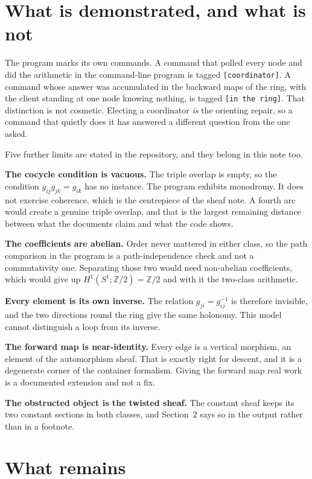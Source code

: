 \documentclass[11pt,a4paper]{article}
\begin{document}
\section{What is demonstrated, and what is not}

The program marks its own commands. A command that polled every node and did the
arithmetic in the command-line program is tagged \verb|[coordinator]|. A command whose
answer was accumulated in the backward maps of the ring, with the client standing at
one node knowing nothing, is tagged \verb|[in the ring]|. That distinction is not
cosmetic. Electing a coordinator \emph{is} the orienting repair, so a command that
quietly does it has answered a different question from the one asked.

Five further limits are stated in the repository, and they belong in this note too.

\textbf{The cocycle condition is vacuous.} The triple overlap is empty, so the
condition $g_{ij}g_{jk} = g_{ik}$ has no instance. The program exhibits monodromy. It
does not exercise coherence, which is the centrepiece of the sheaf note. A fourth arc
would create a genuine triple overlap, and that is the largest remaining distance
between what the documents claim and what the code shows.

\textbf{The coefficients are abelian.} Order never mattered in either class, so the
path comparison in the program is a path-independence check and not a commutativity
one. Separating those two would need non-abelian coefficients, which would give up
$H^1(S^1;\mathbb{Z}/2) = \mathbb{Z}/2$ and with it the two-class arithmetic.

\textbf{Every element is its own inverse.} The relation $g_{ji} = g_{ij}^{-1}$ is
therefore invisible, and the two directions round the ring give the same holonomy.
This model cannot distinguish a loop from its inverse.

\textbf{The forward map is near-identity.} Every edge is a vertical morphism, an
element of the automorphism sheaf. That is exactly right for descent, and it is a
degenerate corner of the container formalism. Giving the forward map real work is a
documented extension and not a fix.

\textbf{The obstructed object is the twisted sheaf.} The constant sheaf keeps its two
constant sections in both classes, and Section~2 says so in the output rather than
in a footnote.

\section{What remains}
\end{document}
